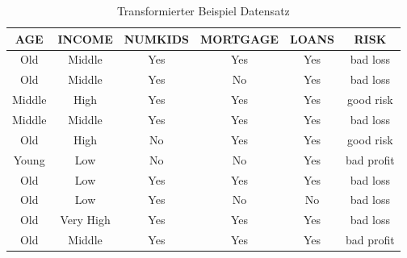 \begin{table}[htbp]
    \centering
    \begin{tabularx}{\linewidth}{cccccc}
        \toprule
        \textbf{AGE} & \textbf{INCOME} & \textbf{NUMKIDS} & \textbf{MORTGAGE} & \textbf{LOANS} & \textbf{RISK} \\
        \toprule
        Old    & Middle    & Yes &     Yes &  Yes &   bad loss \\
        Old    & Middle    & Yes &     No  &  Yes &   bad loss \\
        Middle & High      & Yes &     Yes &  Yes &  good risk \\
        Middle & Middle    & Yes &     Yes &  Yes &   bad loss \\
        Old    & High      & No  &     Yes &  Yes &  good risk \\
        Young  & Low       & No  &     No  &  Yes & bad profit \\
        Old    & Low       & Yes &     Yes &  Yes &   bad loss \\
        Old    & Low       & Yes &     No  &  No  &   bad loss \\
        Old    & Very High & Yes &     Yes &  Yes &   bad loss \\
        Old    & Middle    & Yes &     Yes &  Yes & bad profit \\
        \bottomrule
    \end{tabularx}
    \caption{Transformierter Beispiel Datensatz}
    \label{table:trans-datensatz}
\end{table}